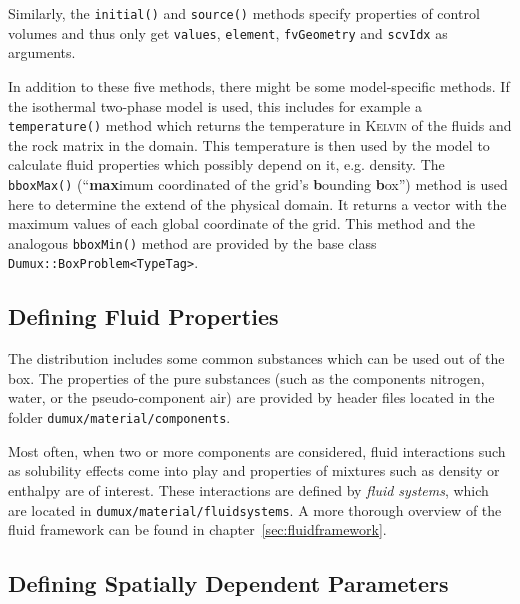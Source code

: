 Similarly, the \texttt{initial()} and \texttt{source()} methods
specify properties of control volumes and thus only get
\texttt{values}, \texttt{element}, \texttt{fvGeometry} and
\texttt{scvIdx} as arguments.

In addition to these five methods, there might be some model-specific
methods. If the isothermal two-phase model is used, this includes for
example a \texttt{temperature()} method which returns the temperature
in \textsc{Kelvin} of the fluids and the rock matrix in the
domain. This temperature is then used by the model to calculate fluid
properties which possibly depend on it, e.g. density. The
\texttt{bboxMax()} (``\textbf{max}imum coordinated of the grid's
\textbf{b}ounding \textbf{b}ox'') method is used here to
determine the extend of the physical domain. It returns a vector with the
maximum values of each global coordinate of the grid. This method
and the analogous \texttt{bboxMin()} method are provided by the base
class \texttt{Dumux::BoxProblem<TypeTag>}.

\subsection{Defining Fluid Properties}\label{tutorial-coupled:description-fluid-class}

The \Dumux distribution includes some common substances which can be
used out of the box. The properties of the pure substances (such as
the components nitrogen, water, or the pseudo-component air) are
provided by header files located in the folder
\verb+dumux/material/components+.

Most often, when two or more components are considered, fluid
interactions such as solubility effects come into play and properties
of mixtures such as density or enthalpy are of interest. These
interactions are defined by {\em fluid systems}, which are located in
\verb+dumux/material/fluidsystems+. A more thorough overview of the
\Dumux fluid framework can be found in chapter~\ref{sec:fluidframework}.


\subsection{Defining Spatially Dependent Parameters}\label{tutorial-coupled:description-spatialParameters}

